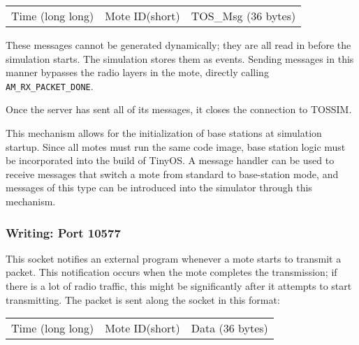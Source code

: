 \documentclass[12pt]{article}
\begin{document}
\vspace{0.1in}
\begin{tabular}{|c|c|c|}\hline
\hspace{2in} & \hspace{2in} & \hspace{0.5in} \\ \hline
Time (long long)& Mote ID(short) & TOS\_Msg (36 bytes) \\ \hline
\end{tabular}
\vspace{0.1in}

These messages cannot be generated dynamically; they are all read in
before the simulation starts. The simulation stores them as
events. Sending messages in this manner bypasses the radio layers in
the mote, directly calling {\tt AM\_RX\_PACKET\_DONE}.

Once the server has sent all of its messages, it closes the connection
to TOSSIM.

This mechanism allows for the initialization of base stations at
simulation startup. Since all motes must run the same code image, base
station logic must be incorporated into the build of TinyOS. A message
handler can be used to receive messages that switch a mote from
standard to base-station mode, and messages of this type can be
introduced into the simulator through this mechanism.

\subsubsection*{Writing: Port 10577}

This socket notifies an external program whenever a mote starts to
transmit a packet. This notification occurs when the mote completes
the transmission; if there is a lot of radio traffic, this might be
significantly after it attempts to start transmitting. The packet is
sent along the socket in this format:

\vspace{0.1in}
\begin{tabular}{|c|c|c|}\hline
\hspace{2in} & \hspace{2in} & \hspace{0.5in} \\ \hline
Time (long long)& Mote ID(short) & Data (36 bytes) \\ \hline
\end{tabular}
\vspace{0.1in}
\end{document}
